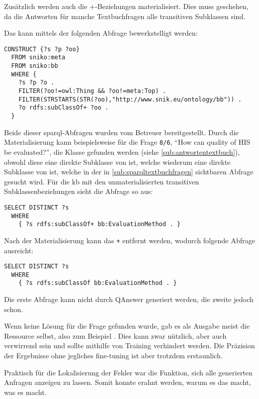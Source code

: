 Zusätzlich werden auch die +-Beziehungen materialisiert.
Dies muss geschehen, da die Antworten für manche Textbuchfragen alle transitiven Subklassen sind.

Das kann mittels der folgenden Abfrage bewerkstelligt werden:
\begin{lstlisting}[language=SPARQL]
  CONSTRUCT {?s ?p ?oo}
  FROM sniko:meta
  FROM sniko:bb
  WHERE {
    ?s ?p ?o . 
    FILTER(?oo!=owl:Thing && ?oo!=meta:Top) .
    FILTER(STRSTARTS(STR(?oo),"http://www.snik.eu/ontology/bb")) .
    ?o rdfs:subClassOf+ ?oo .
  }
\end{lstlisting}

Beide dieser \ac{sparql}-Abfragen wurden vom Betreuer bereitgestellt.
Durch die Materialisierung kann beispielsweise für die Frage \texttt{8/6}, \enquote{How can quality of HIS be evaluated?},
die Klasse  gefunden werden (siehe \cref{sub:antwortentextbuch}), obwohl diese eine direkte Subklasse von  ist,
welche wiederum eine direkte Subklasse von  ist, welche in der in \cref{sub:sparqltextbuchfragen} sichtbaren Abfrage gesucht wird.
Für die \ac{kb} mit den unmaterialisierten transitiven Subklassenbeziehungen sieht die Abfrage so aus:
\begin{lstlisting}[language=SPARQL]
  SELECT DISTINCT ?s
  WHERE
    { ?s rdfs:subClassOf+ bb:EvaluationMethod . }
\end{lstlisting}

Nach der Materialisierung kann das \texttt{+} entfernt werden, wodurch folgende Abfrage ausreicht:
\begin{lstlisting}[language=SPARQL]
  SELECT DISTINCT ?s
  WHERE
    { ?s rdfs:subClassOf bb:EvaluationMethod . }
\end{lstlisting}

Die erste Abfrage kann nicht durch QAnswer generiert werden, die zweite jedoch schon.

Wenn keine Lösung für die Frage gefunden wurde, gab es als Ausgabe meist die Ressource selbst, also zum Beispiel .
Dies kann zwar nützlich, aber auch verwirrend sein und sollte mithilfe von Training verhindert werden.
Die Präzision der Ergebnisse ohne jegliches fine-tuning ist aber trotzdem erstaunlich.

Praktisch für die Lokalisierung der Fehler war die Funktion, sich alle generierten Anfragen anzeigen zu lassen.
Somit konnte erahnt werden, warum es das macht, was es macht.

